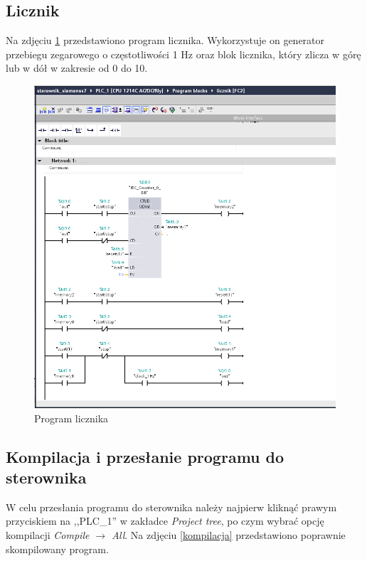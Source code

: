 \documentclass[12pt]{article}
\begin{document}
\subsection{Licznik}
Na zdjęciu \ref{licznik} przedstawiono program licznika. Wykorzystuje on generator przebiegu zegarowego o częstotliwości 1 Hz oraz blok licznika, który zlicza w górę lub w dół w zakresie od 0 do 10.

\begin{figure}[H]
    \centering
    \includegraphics[width=\textwidth]{./zdj/licznik.png}
    \caption{Program licznika}
    \label{licznik}
\end{figure} 


\subsection{Kompilacja i przesłanie programu do sterownika}
W celu przesłania programu do sterownika należy najpierw kliknąć prawym przyciskiem na ,,PLC\_1'' w zakładce \textit{Project tree}, po czym wybrać opcję kompilacji \textit{Compile $\rightarrow$ All}. Na zdjęciu \ref{kompilacja} przedstawiono poprawnie skompilowany program.
\end{document}

